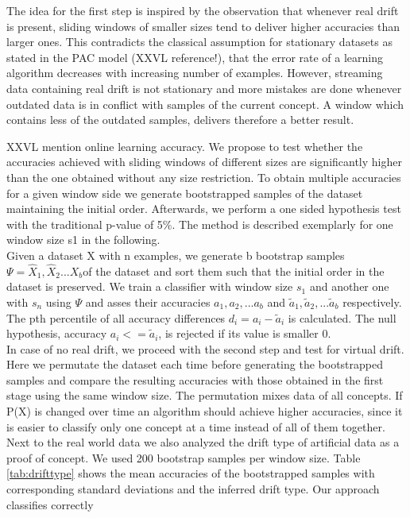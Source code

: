 \documentclass[conference]{IEEEtran}
\begin{document}
The idea for the first step is inspired by the observation that whenever real drift is present, sliding windows of smaller sizes tend to deliver higher accuracies than larger ones. 
This contradicts the classical assumption for stationary datasets as stated in the PAC model (XXVL reference!), that the error rate of a learning algorithm decreases
with increasing number of examples. 
However, streaming data containing real drift is not stationary and more mistakes are done whenever outdated data is in conflict with samples of the current concept. 
A window which contains less of the outdated samples, delivers therefore a better result. 

XXVL mention online learning accuracy.
We propose to test whether the accuracies achieved with sliding windows of different sizes are significantly higher than the one obtained without any size restriction. 
To obtain multiple accuracies for a given window side we generate bootstrapped samples of the dataset maintaining the initial order. 
Afterwards, we perform a one sided hypothesis test with the traditional p-value of 5\%.
The method is described exemplarly for one window size s1 in the following.\\
Given a dataset X with n examples, we generate b bootstrap samples $\Psi=\hat{X}_1,\hat{X}_2...{X}_b$of the dataset and sort them such that the initial order in the dataset is preserved. 
We train a classifier with window size $s_1$ and another one with $s_n$ using $\Psi$ and asses their accuracies $a_1,a_2,...a_b$ and $\tilde{a}_1,\tilde{a}_2,...\tilde{a}_b$ respectively.  
The pth percentile of all accuracy differences $d_i = a_i - \tilde{a}_i$ is calculated. The null hypothesis, accuracy $a_i <= \tilde{a}_i$, is rejected if its value is smaller 0.\\
In case of no real drift, we proceed with the second step and test for virtual drift. Here we permutate the dataset each time before generating the bootstrapped samples and compare
the resulting accuracies with those obtained in the first stage using the same window size. The permutation mixes data of all concepts. If P(X) is changed over time an 
algorithm should achieve higher accuracies, since it is easier to classify only one concept at a time instead of all of them together.\\
Next to the real world data we also analyzed the drift type of artificial data as a proof of concept. We used 200 bootstrap samples per window size.
Table \ref{tab:drifttype} shows the mean accuracies of the bootstrapped samples with corresponding standard deviations and the inferred drift type. Our approach classifies correctly
\end{document}
